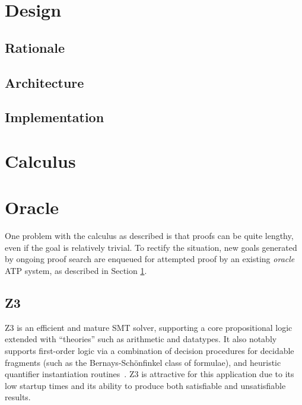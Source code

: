 \documentclass[runningheads]{llncs}
\newcommand{\z}[1]{\textsc{Z3}}
\begin{document}
\section{Design}
\label{section:Design}
\subsection{Rationale}
\subsection{Architecture}
\subsection{Implementation}

\section{Calculus}

\section{Oracle}
\label{section:oracle}
One problem with the calculus as described is that proofs can be quite lengthy, even if the goal is relatively trivial.
To rectify the situation, new goals generated by ongoing proof search are enqueued for attempted proof by an existing \emph{oracle} ATP system, as described in Section \ref{section:Design}.

\subsection{Z3}
\z3{}\cite{Z3} is an efficient and mature SMT solver, supporting a core propositional logic extended with ``theories'' such as arithmetic and datatypes.
It also notably supports first-order logic via a combination of decision procedures for decidable fragments (such as the Bernays-Sch\"onfinkel class of formulae), and heuristic quantifier instantiation routines~\cite{quantifier-instantiation}.
\z3{} is attractive for this application due to its low startup times and its ability to produce both satisfiable and unsatisfiable results.
\end{document}
